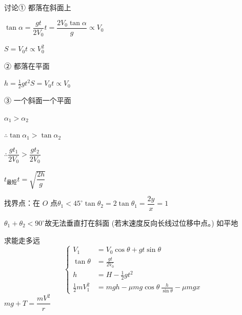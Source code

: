 \noindent 讨论\quad ① 都落在斜面上

\noindent $\tan\alpha=\dfrac{gt}{2V_0}$\qquad $t=\dfrac{2V_0\tan\alpha}{g}\propto V_0$\qquad {}

\noindent $S=V_0t\propto V_0^2$\qquad {}%

\noindent ② 都落在平面

\noindent $h=\tfrac12gt^2$\quad {}\quad $S=V_0t\propto V_0$\quad {}

\noindent ③ 一个斜面一个平面

\noindent $\alpha_1>\alpha_2$

\noindent $\therefore\tan\alpha_1>\tan\alpha_2$

\noindent $\therefore\dfrac{gt_1}{2V_0}>\dfrac{gt_2}{2V_0}$

\noindent {}%
\noindent $t_{\text{最短}}$\quad $t=\sqrt{\dfrac{2h}{g}}$

\noindent 找界点：在 $O$ 点\quad $\theta_1<45^\circ$\qquad $\tan\theta_2=2\tan\theta_1=\dfrac{2y}{x}=1$

\noindent $\theta_1+\theta_2<90^\circ$\qquad 故无法垂直打在斜面 (若末速度反向长线过位移中点。)%
\noindent 如平地%

\noindent 求能走多远
\[
\left\{\begin{aligned}
V_1&=V_0\cos\theta+gt\sin\theta\\
\tan\theta&=\frac{gt}{2V_0}\\
h&=H-\tfrac12gt^2\\
\tfrac12mV_1^2&=mgh-\mu mg\cos\theta\,\frac{h}{\sin\theta}-\mu mgx
\end{aligned}\right.
\]
\noindent $mg+T=\dfrac{mV^2}{r}$%

